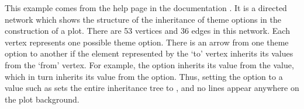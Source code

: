 This example comes from the  help page in the  documentation \citep{ggplot2}.  It is a directed network which shows the structure of the inheritance of theme options in the construction of a  plot. There are 53 vertices and 36 edges in this network. Each vertex represents one possible theme option. There is an arrow from one theme option to another if the element represented by the `to' vertex inherits its values from the `from' vertex.  For example, the  option inherits its value from the  value, which in turn inherits its value from the  option.  Thus, setting the  option to a value such as  sets the entire inheritance tree to , and no lines appear anywhere on the plot background. %

